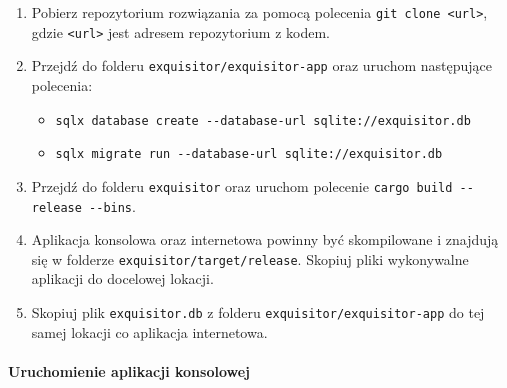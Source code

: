                 \begin{enumerate}
                    \item {
                        Pobierz repozytorium rozwiązania za pomocą polecenia \texttt{git clone <url>}, gdzie \texttt{<url>} jest adresem repozytorium z kodem.
                    }
                    \item {
                        Przejdź do folderu \texttt{exquisitor/exquisitor-app} oraz uruchom następujące polecenia:

                        \begin{itemize}
                            \item {
                                \texttt{sqlx database create -\phantom{}-database-url sqlite://exquisitor.db}
                            }
                            \item {
                                \texttt{sqlx migrate run -\phantom{}-database-url sqlite://exquisitor.db}
                            }
                        \end{itemize}
                    }
                    \item {
                        Przejdź do folderu \texttt{exquisitor} oraz uruchom polecenie \texttt{cargo build -\phantom{}-release -\phantom{}-bins}.
                    }
                    \item {
                        Aplikacja konsolowa oraz internetowa powinny być skompilowane i znajdują się w folderze \texttt{exquisitor/target/release}. 
                        Skopiuj pliki wykonywalne aplikacji do docelowej lokacji.
                    }
                    \item{
                        Skopiuj plik \texttt{exquisitor.db} z folderu \texttt{exquisitor/exquisitor-app} do tej samej lokacji co aplikacja internetowa.
                    }
                \end{enumerate}
            
            \paragraph{Uruchomienie aplikacji konsolowej}

